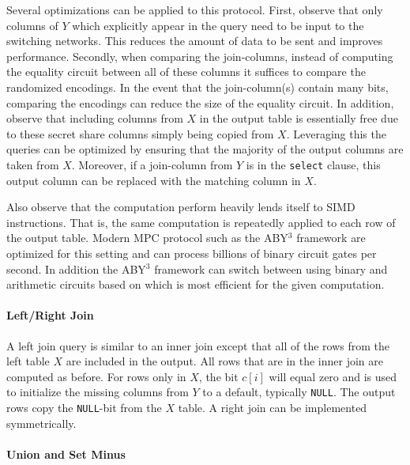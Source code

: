 \iffullversion
Several optimizations can be applied to this protocol. First, observe that only columns of $Y$ which explicitly appear in the query need to be input to the switching networks. This reduces the amount of data to be sent and improves performance. Secondly, when comparing the join-columns, instead of computing the equality circuit between all of these columns it suffices to compare the randomized encodings. In the event that the join-column(s) contain many bits, comparing the encodings can reduce the size of the equality circuit. In addition, observe that including columns from $X$ in the output table is essentially free due to these secret share columns simply being copied from $X$. Leveraging this the queries can be optimized by ensuring that the majority of the output columns are taken from $X$. Moreover, if a join-column from $Y$ is in the \texttt{select} clause, this output column can be replaced with the matching column in $X$.

Also observe that the computation perform heavily lends itself to SIMD instructions. That is, the same computation is repeatedly applied to each row of the output table. Modern MPC protocol such as the ABY$^3$ framework \cite{aby3,highthroughput} are optimized for this setting and can process billions of binary circuit gates per second\cite{highthroughput}. In addition the ABY$^3$ framework can switch between using binary and arithmetic circuits based on which is most efficient for the given computation. 
\fi

\paragraph{Left/Right Join}

A left join query is similar to an inner join except that all of the rows from the left table $X$ are included in the output. All rows that are in the inner join are computed as before. For rows only in $X$, the bit $c[i]$ will equal zero and is used to initialize the missing columns from $Y$ to a default, typically \texttt{NULL}. The output rows copy the \texttt{NULL}-bit from the $X$ table. A right join can be implemented symmetrically.

\paragraph{Union and Set Minus}

